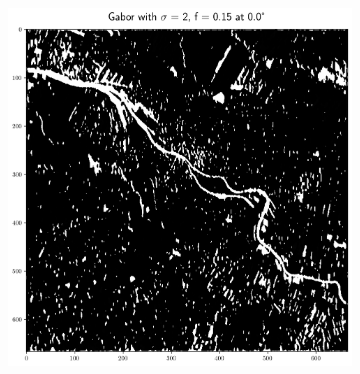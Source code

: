 \documentclass[12pt,a4paper, english,twoside]{article}
\begin{document}
\begin{figure}[!htbp]
\begin{subfigure}[b]{0.45\textwidth}
         \includegraphics[width=\textwidth]{img/Features_2_015_0.png}
         \label{fig:feat02}
     \end{subfigure}


\end{figure}
\end{document}
